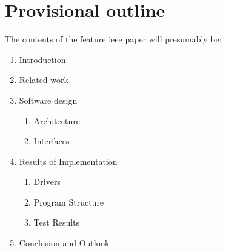 %
%

\chapter{Provisional outline}
\label{chap:Provisional outline}
%
The contents of the feature \acs{ieee} paper will presumably be:
%
\begin{enumerate}[label=\Roman*.]
	\item Introduction
	\item Related work
	\item Software design
	\begin{enumerate}[label=\Alph*.]
		\item Architecture
		\item Interfaces
	\end{enumerate}
	\item Results of Implementation
	\begin{enumerate}[label=\Alph*.]
		\item Drivers
		\item Program Structure
		\item Test Results
	\end{enumerate}
	\item Conclusion and Outlook
\end{enumerate}